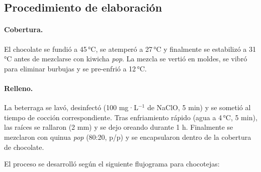\documentclass[manuscript,screen,review]{acmart}
\begin{document}
    \subsection{Procedimiento de elaboración}
    \paragraph{Cobertura.} El chocolate se fundió a 45\,°C, se atemperó a 27\,°C y finalmente se estabilizó a 31\,°C antes de mezclarse con kiwicha \emph{pop}.  
    La mezcla se vertió en moldes, se vibró para eliminar burbujas y se pre-enfrió a 12\,°C.
    
    \paragraph{Relleno.} La beterraga se lavó, desinfectó (100 mg·L\(^{-1}\) de NaClO, 5 min) y se sometió al tiempo de cocción correspondiente. Tras enfriamiento rápido (agua a 4\,°C, 5 min), las raíces se rallaron (2 mm) y se dejo oreando durante 1 h. Finalmente se mezclaron con quinua \emph{pop} (80:20, p/p) y se encapsularon dentro de la cobertura de chocolate.

                    El proceso se desarrolló según el siguiente flujograma para chocotejas:
                    
\end{document}
